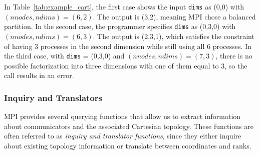 \documentclass[12pt]{book}
\begin{document}
\noindent
In Table~\ref{tab:example_cart}, the first case shows the input \texttt{dims} as (0,0) with $(nnodes, ndims) = (6,2)$. The output is (3,2), meaning MPI chose a balanced partition.  
In the second case, the programmer specifies \texttt{dims} as (0,3,0) with $(nnodes, ndims) = (6,3)$. The output is (2,3,1), which satisfies the constraint of having 3 processes in the second dimension while still using all 6 processes.  
In the third case, with \texttt{dims} = (0,3,0) and $(nnodes, ndims) = (7,3)$, there is no possible factorization into three dimensions with one of them equal to 3, so the call results in an error.

\subsubsection{Inquiry and Translators}
MPI provides several querying functions that allow us to extract information about communicators and the associated Cartesian topology. These functions are often referred to as \emph{inquiry and translator functions}, since they either inquire about existing topology information or translate between coordinates and ranks.
\end{document}
